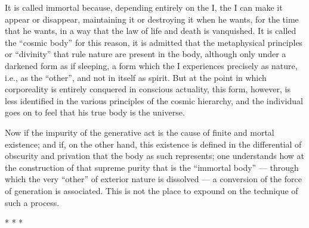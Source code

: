 It is called immortal because, depending entirely on the I, the I can make it appear or disappear, maintaining it or destroying it when he wants, for the time that he wants, in a way that the law of life and death is vanquished. It is called the “cosmic body” for this reason, it is admitted that the metaphysical principles or “divinity” that rule nature are present in the body, although only under a darkened form as if sleeping, a form which the I experiences precisely as nature, i.e., as the “other”, and not in itself as spirit. But at the point in which corporeality is entirely conquered in conscious actuality, this form, however, is less identified in the various principles of the cosmic hierarchy, and the individual goes on to feel that his true body is the universe.

Now if the impurity of the generative act is the cause of finite and mortal existence; and if, on the other hand, this existence is defined in the differential of obscurity and privation that the body as such represents; one understands how at the construction of that supreme purity that is the “immortal body” — through which the very “other” of exterior nature is dissolved — a conversion of the force of generation is associated. This is not the place to expound on the technique of such a process.




\begin{center}* * *\end{center}

